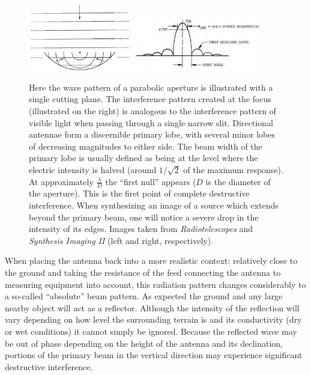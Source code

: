 \begin{figure}[ht]
 \begin{mdframed}
  \centering
  \includegraphics[width=0.4\textwidth]{images/diffraction_pattern.png}
  \includegraphics[width=0.5\textwidth]{images/radiation_pattern.png}
  \caption[Collection of electromagnetic wave energy and response]{Here the wave pattern of a parabolic aperture is 
  illustrated with a single cutting plane. The interference pattern created at the focus (illustrated on the right) is analogous to the interference pattern 
  of visible light when passing through a single narrow slit. Directional antennae form a discernible primary lobe, with several minor lobes of decreasing magnitudes to
  either side. The beam width of the primary lobe is usually defined as being at the level where the electric intensity is halved (around $1/\sqrt{2}$ of the maximum response).
  At approximately $\frac{\lambda}{D}$ the ``first null'' appears ($D$ is the diameter of the aperture). This is the first point of complete destructive interference. When synthesizing
  an image  of a source which extends beyond the primary beam, one will notice a severe drop in the intensity of its edges. Images taken from \textit{Radiotelescopes} \cite{christiansenradiotelescopes} 
  and \textit{Synthesis Imaging II} \cite{taylor1999synthesis} (left and right, respectively).}
  \label{diffraction_pattern}
 \end{mdframed}
\end{figure}

When placing the antenna back into a more realistic context: relatively close to the ground and taking the resistance of the feed connecting the antenna
to measuring equipment into account, this radiation pattern changes considerably to a so-called ``absolute'' beam pattern.
As expected the ground and any large nearby object will act as a reflector. Although the intensity of the reflection will vary depending
on how level the surrounding terrain is and its conductivity (dry or wet conditions) it cannot simply be ignored. Because the reflected wave may
be out of phase depending on the height of the antenna and its declination, portions of the primary beam in the vertical direction
may experience significant destructive interference.

